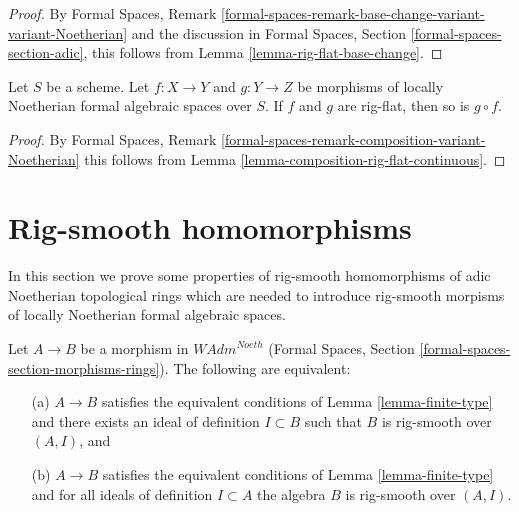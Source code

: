 \begin{proof}
By Formal Spaces, Remark
\ref{formal-spaces-remark-base-change-variant-variant-Noetherian}
and the discussion in Formal Spaces, Section
\ref{formal-spaces-section-adic},
this follows from
Lemma \ref{lemma-rig-flat-base-change}.
\end{proof}

\begin{lemma}
\label{lemma-composition-rig-flat}
Let $S$ be a scheme. Let $f : X \to Y$ and $g : Y \to Z$
be morphisms of locally Noetherian formal algebraic spaces over $S$.
If $f$ and $g$ are rig-flat, then so is $g \circ f$.
\end{lemma}

\begin{proof}
By Formal Spaces, Remark
\ref{formal-spaces-remark-composition-variant-Noetherian}
this follows from Lemma \ref{lemma-composition-rig-flat-continuous}.
\end{proof}










\section{Rig-smooth homomorphisms}
\label{section-rig-smooth-homomorphisms}

\noindent
In this section we prove some properties of
rig-smooth homomorphisms of adic Noetherian
topological rings which are needed to introduce
rig-smooth morpisms of locally Noetherian
formal algebraic spaces.

\begin{lemma}
\label{lemma-rig-smooth-continuous}
Let $A \to B$ be a morphism in $\textit{WAdm}^{Noeth}$
(Formal Spaces, Section \ref{formal-spaces-section-morphisms-rings}).
The following are equivalent:
\begin{enumerate}
\item[(a)] $A \to B$ satisfies the equivalent conditions of
Lemma \ref{lemma-finite-type} and there exists an ideal of definition
$I \subset B$ such that $B$ is rig-smooth over $(A, I)$, and
\item[(b)] $A \to B$ satisfies the equivalent conditions of
Lemma \ref{lemma-finite-type} and for all ideals of definition
$I \subset A$ the algebra $B$ is rig-smooth over $(A, I)$.
\end{enumerate}
\end{lemma}

